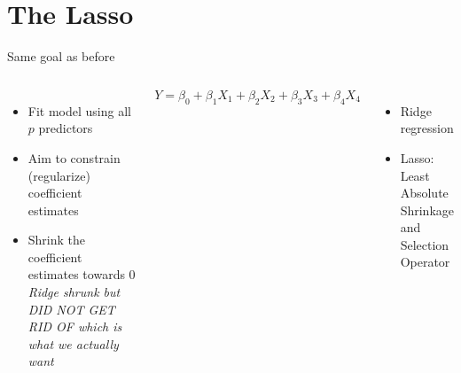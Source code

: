 \documentclass[aspectratio=169,usenames,dvipsnames]{beamer}
\newcommand{\InstructorNotes}[1]{\textit{\color{orange}#1}}
\newcommand{\InstructorList}[1]{
\begin{itemize}
	\color{orange}
	#1
\end{itemize}
}
\begin{document}

\section{The Lasso}

\begin{frame}[t]{Same goal as before }

\begin{columns}
\centering
\begin{itemize}
	\item Fit model using all $p$ predictors
	\item Aim to constrain (regularize) coefficient estimates
	\item Shrink the coefficient estimates towards 0 \InstructorNotes{Ridge shrunk but DID NOT GET RID OF which is what we actually want}
\end{itemize}
\centering

\begin{equation*}
	Y = \beta_0 + \beta_1 X_1 + \beta_2 X_2 + \beta_3 X_3 + \beta_4 X_4
\end{equation*}
\InstructorList{
\item Ridge regression
\item Lasso: Least Absolute Shrinkage and Selection Operator
}
\end{columns}

\end{frame}
\end{document}
